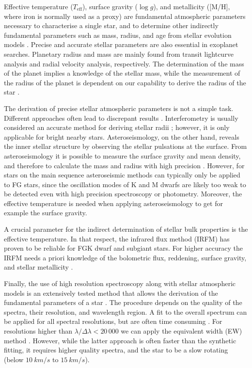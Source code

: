 \documentclass{aa}
\begin{document}
Effective temperature ($T_\mathrm{eff}$), surface gravity ($\log g$),
and metallicity ([M/H], where iron is normally used as a proxy)
are fundamental atmospheric parameters necessary to characterise a single
star, and to determine other indirectly fundamental parameters
such as mass, radius, and age from stellar evolution models
\citep[see e.g.][]{Girardi2000,Dotter2008,Baraffe2015}.
Precise and accurate stellar parameters are also essential in
exoplanet searches. Planetary radius and mass are mainly found from
transit lightcurve analysis and radial velocity analysis, respectively. The
determination of the mass of the planet implies a knowledge of the
stellar mass, while the measurement of the radius of the planet
is dependent on our capability to derive the radius of the star
\citep[see e.g.][]{Torres2008,Ammler2009,Torres2012}.

The derivation of precise stellar atmospheric parameters is not a simple task.
Different approaches often lead to discrepant results \citep[see
e.g.][]{Torres2010,Lebzelter2012b,Santos13}. Interferometry is usually
considered  an accurate method for deriving stellar radii \citep[see
e.g.][]{Boyajian2012}; however, it is only applicable for bright nearby stars.
Asteroseismology, on the other hand, reveals the inner stellar structure by
observing the stellar pulsations at the surface. From asteroseismology it is
possible to measure the surface gravity and mean density, and therefore to
calculate the mass and radius with high precision \citep[e.g.][]{Kjeldsen1995}.
However, for stars on the main sequence asteroseismic methods can typically only
be applied to FG stars, since the oscillation modes of K and M dwarfs are likely
too weak to be detected even with high precision spectroscopy or photometry.
Moreover, the effective temperature is needed when applying asteroseismology to
get for example the surface gravity.

A crucial parameter for the indirect determination of stellar bulk properties is
the effective temperature. In that respect, the infrared flux method (IRFM) has
proven to be reliable for FGK dwarf and subgiant stars. For higher accuracy the
IRFM needs a priori knowledge of the bolometric flux, reddening, surface
gravity, and stellar metallicity
\citep{Blackwell1977,Ramirez2005b,Casagrande2010}.

Finally, the use of high resolution spectroscopy along with stellar atmospheric
models is an extensively tested method that allows the derivation of the
fundamental parameters of a star \citep[see e.g.][]{Valenti2005,Santos13}. The
procedure depends on the quality of the spectra, their resolution, and
wavelength region. A fit to the overall spectrum can be applied for all spectral
resolutions, but are often time consuming \citep[see e.g.][]{Recio2006}. For
resolutions higher than $\lambda/\Delta\lambda < 20\,000$ we can apply the
equivalent width (EW) method \citep[see e.g.][for details]{Tsantaki2014,Andreasen2017a}.
However, while the latter approach is often faster than the synthetic fitting,
it requires higher quality spectra, and the star to be a slow rotating (below
$\SI{10}{km/s}$ to $\SI{15}{km/s}$).
\end{document}
